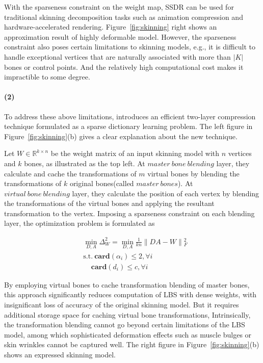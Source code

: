 With the sparseness constraint on the weight map, SSDR can be used for traditional skinning decomposition tasks such as animation compression and hardware-accelerated rendering.
Figure~\ref{fig:skinning} right shows an approximation result of highly deformable model.
However, the sparseness constraint also poses certain limitations to skinning models,
e.g., it is difficult to handle exceptional vertices that are naturally associated with more than $|K|$ bones or control points.
And the relatively high computational cost makes it impractible to some degree.

\paragraph{(2)}
To address these above limitations, \cite{le2013two} introduces an efficient two-layer compression technique formulated as a sparse dictionary learning problem.
The left figure in Figure~\ref{fig:skinning}(b) gives a clear explanation about the new technique.

Let $W\in\mathbb{R}^{k\times n}$ be the weight matrix of an input skinning model with $n$ vertices and $k$ bones, as illustrated as the top left.
At $master~bone~blending$ layer, they calculate and cache the transformations of $m$ virtual bones by blending the transformations of $k$ original bones(called $master~bones$).
At $virtual~bone~blending$ layer, they calculate the position of each vertex by blending the transformations of the virtual bones and applying the resultant transformation to the vertex.
Imposing a sparseness constraint on each blending layer, the optimization problem is formulated as

\small{
\begin{equation}
 \label{eq:TwoLayer}
 \begin{split}
 & \min_{D,A}\Delta_{W}^2=\min_{D,A}\frac{1}{kn}\|DA-W\|{_{F}^2} \\
 & \mathrm{s.t.}~\textbf{card}(\alpha_{i})\leq2,\forall i\\
 & ~~~~~\textbf{card}(d_{i})\leq c,\forall i
 \end{split}
\end{equation}
}

By employing virtual bones to cache transformation blending of master bones,
this approach significantly reduces computation of LBS with dense weights, with insignificant loss of accuracy of the original skinning model.
But it requires additional storage space for caching virtual bone transformations,
Intrinsically, the transformation blending cannot go beyond certain limitations of the LBS model,
among which sophisticated deformation effects such as muscle bulges or skin wrinkles cannot be captured well.
The right figure in Figure~\ref{fig:skinning}(b) shows an expressed skinning model.


